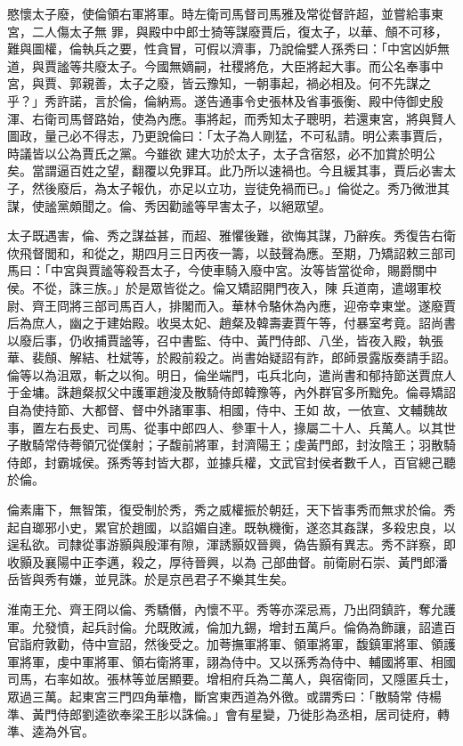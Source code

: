 \begin{pinyinscope}
 愍懷太子廢，使倫領右軍將軍。時左衛司馬督司馬雅及常從督許超，並嘗給事東宮，二人傷太子無
 罪，與殿中中郎士猗等謀廢賈后，復太子，以華、頠不可移，難與圖權，倫執兵之要，性貪冒，可假以濟事，乃說倫嬖人孫秀曰：「中宮凶妒無道，與賈謐等共廢太子。今國無嫡嗣，社稷將危，大臣將起大事。而公名奉事中宮，與賈、郭親善，太子之廢，皆云豫知，一朝事起，禍必相及。何不先謀之乎？」秀許諾，言於倫，倫納焉。遂告通事令史張林及省事張衡、殿中侍御史殷渾、右衛司馬督路始，使為內應。事將起，而秀知太子聰明，若還東宮，將與賢人圖政，量己必不得志，乃更說倫曰：「太子為人剛猛，不可私請。明公素事賈后，時議皆以公為賈氏之黨。今雖欲
 建大功於太子，太子含宿怒，必不加賞於明公矣。當謂逼百姓之望，翻覆以免罪耳。此乃所以速禍也。今且緩其事，賈后必害太子，然後廢后，為太子報仇，亦足以立功，豈徒免禍而已。」倫從之。秀乃微泄其謀，使謐黨頗聞之。倫、秀因勸謐等早害太子，以絕眾望。



 太子既遇害，倫、秀之謀益甚，而超、雅懼後難，欲悔其謀，乃辭疾。秀復告右衛佽飛督閭和，和從之，期四月三日丙夜一籌，以鼓聲為應。至期，乃矯詔敕三部司馬曰：「中宮與賈謐等殺吾太子，今使車騎入廢中宮。汝等皆當從命，賜爵關中侯。不從，誅三族。」於是眾皆從之。倫又矯詔開門夜入，陳
 兵道南，遣翊軍校尉、齊王冏將三部司馬百人，排閣而入。華林令駱休為內應，迎帝幸東堂。遂廢賈后為庶人，幽之于建始殿。收吳太妃、趙粲及韓壽妻賈午等，付暴室考竟。詔尚書以廢后事，仍收捕賈謐等，召中書監、侍中、黃門侍郎、八坐，皆夜入殿，執張華、裴頠、解結、杜斌等，於殿前殺之。尚書始疑詔有詐，郎師景露版奏請手詔。倫等以為沮眾，斬之以徇。明日，倫坐端門，屯兵北向，遣尚書和郁持節送賈庶人于金墉。誅趙粲叔父中護軍趙浚及散騎侍郎韓豫等，內外群官多所黜免。倫尋矯詔自為使持節、大都督、督中外諸軍事、相國，侍中、王如
 故，一依宣、文輔魏故事，置左右長史、司馬、從事中郎四人、參軍十人，掾屬二十人、兵萬人。以其世子散騎常侍荂領冗從僕射；子馥前將軍，封濟陽王；虔黃門郎，封汝陰王；羽散騎侍郎，封霸城侯。孫秀等封皆大郡，並據兵權，文武官封侯者數千人，百官總己聽於倫。



 倫素庸下，無智策，復受制於秀，秀之威權振於朝廷，天下皆事秀而無求於倫。秀起自瑯邪小史，累官於趙國，以諂媚自達。既執機衡，遂恣其姦謀，多殺忠良，以逞私欲。司隸從事游顥與殷渾有隙，渾誘顥奴晉興，偽告顥有異志。秀不詳察，即收顥及襄陽中正李邁，殺之，厚待晉興，以為
 己部曲督。前衛尉石崇、黃門郎潘岳皆與秀有嫌，並見誅。於是京邑君子不樂其生矣。



 淮南王允、齊王冏以倫、秀驕僭，內懷不平。秀等亦深忌焉，乃出冏鎮許，奪允護軍。允發憤，起兵討倫。允既敗滅，倫加九錫，增封五萬戶。倫偽為飾讓，詔遣百官詣府敦勸，侍中宣詔，然後受之。加荂撫軍將軍、領軍將軍，馥鎮軍將軍、領護軍將軍，虔中軍將軍、領右衛將軍，詡為侍中。又以孫秀為侍中、輔國將軍、相國司馬，右率如故。張林等並居顯要。增相府兵為二萬人，與宿衛同，又隱匿兵士，眾過三萬。起東宮三門四角華櫓，斷宮東西道為外徼。或謂秀曰：「散騎常
 侍楊準、黃門侍郎劉逵欲奉梁王肜以誅倫。」會有星變，乃徙肜為丞相，居司徒府，轉準、逵為外官。




\end{pinyinscope}
